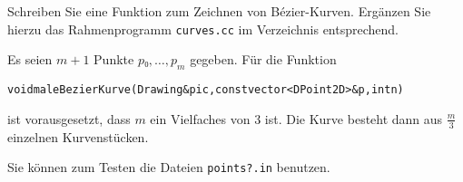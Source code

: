 \label{aufgabe:bezier}
%
Schreiben Sie eine Funktion zum Zeichnen von Bézier-Kurven. Ergänzen Sie 
hierzu das Rahmenprogramm \texttt{curves.cc} im Verzeichnis 
 entsprechend.

Es seien $m + 1$ Punkte $p₀, …, p_m$ gegeben. Für die Funktion
\begin{alltt}
   void maleBezierKurve(Drawing& pic, const vector<DPoint2D>& p, int n)
\end{alltt}
ist vorausgesetzt, dass $m$ ein Vielfaches von $3$ ist. Die Kurve 
besteht dann aus $\frac{m}{3}$ einzelnen Kurvenstücken.

Sie können zum Testen die Dateien \texttt{points?.in} benutzen.
